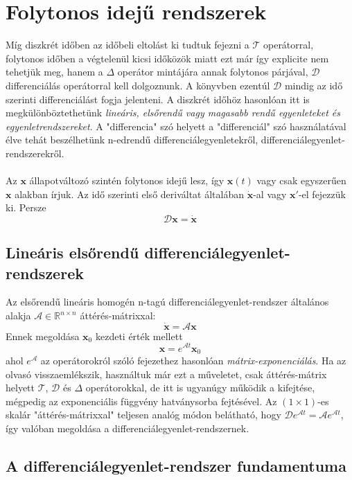 \documentclass[14p]{article}
\begin{document}
\section{Folytonos idejű rendszerek}
Míg diszkrét időben az időbeli eltolást ki tudtuk fejezni a $\mathcal{T}$ operátorral, folytonos időben a végtelenül kicsi időközök miatt ezt már így explicite nem tehetjük meg, hanem a $\Delta$ operátor mintájára annak folytonos párjával, $\mathcal{D}$ differenciálás operátorral kell dolgoznunk. A könyvben ezentúl $\mathcal{D}$ mindig az idő szerinti differenciálást fogja jelenteni. A diszkrét időhöz hasonlóan itt is megkülönböztethetünk \emph{lineáris, elsőrendű vagy magasabb rendű egyenleteket és egyenletrendszereket}. A "differencia" szó helyett a "differenciál" szó használatával élve tehát beszélhetünk n-edrendű differenciálegyenletekről, differenciálegyenlet-rendszerekről. 
\\
\\
Az $\pmb{x}$ állapotváltozó szintén folytonos idejű lesz, így $\pmb{x}(t)$ vagy csak egyszerűen $\pmb{x}$ alakban írjuk. Az idő szerinti első deriváltat általában $\dot{\pmb{x}}$-al vagy $\pmb{x}'$-el fejezzük ki. Persze
\[
	\mathcal{D}\pmb{x} = \dot{\pmb{x}}
\]
\subsection{Lineáris elsőrendű differenciálegyenlet-rendszerek}
Az elsőrendű lineáris homogén n-tagú differenciálegyenlet-rendszer általános alakja $\mathcal{A} \in \mathbb{R}^{n \times n}$ áttérés-mátrixxal:
\[
	\dot{\pmb{x}} = \mathcal{A}\pmb{x}
\]
Ennek megoldása $\pmb{x}_0$ kezdeti érték mellett
\[
	\pmb{x} = e^{\mathcal{A}t}\pmb{x}_0
\]
ahol $e^{\mathcal{A}}$ az operátorokról szóló fejezethez hasonlóan \emph{mátrix-exponenciálás}. Ha az olvasó visszaemlékszik, használtuk már ezt a műveletet, csak áttérés-mátrix helyett $\mathcal{T}$, $\mathcal{D}$ és $\Delta$ operátorokkal, de itt is ugyanúgy működik a kifejtése, mégpedig az exponenciális függvény hatványsorba fejtésével. Az $(1  \times 1)$-es skalár "áttérés-mátrixxal" teljesen analóg módon belátható, hogy $\mathcal{D}e^{\mathcal{A}t} = \mathcal{A}e^{\mathcal{A}t}$, így valóban megoldása a differenciálegyenlet-rendszernek.

\subsection{A differenciálegyenlet-rendszer fundamentuma}
\end{document}

